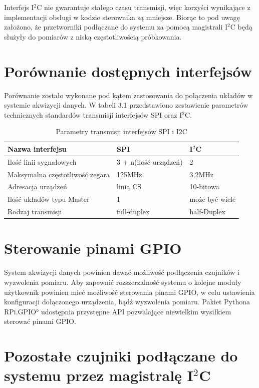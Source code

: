Interfejs I$^2$C nie gwarantuje stałego czasu transmisji, więc korzyści wynikające z implementacji obsługi w kodzie sterownika są mniejsze. Biorąc to pod uwagę założono, że przetworniki podłączane do systemu za pomocą magistrali I$^2$C będą służyły do pomiarów z niską częstotliwością próbkowania.

\section{Porównanie dostępnych interfejsów}

Porównanie zostało wykonane pod kątem zastosowania do połączenia układów w systemie akwizycji danych. W tabeli 3.1 przedstawiono zestawienie parametrów technicznych standardów transmisji interfejsów SPI oraz I$^2$C. 


\begin{table}[!ht]
\label{tab3.2}
\begin{tabular}{|l|l|l|}
  \hline 
  Nazwa interfejsu & SPI & I$^2$C\\
  \hline
  Ilość linii sygnałowych & 3 + n(ilość urządzeń)  & 2 \\
  \hline  
  Maksymalna częstotliwość zegara & 125MHz  & 3,2MHz \\
  \hline
  Adresacja urządzeń & linia CS & 10-bitowa  \\
  \hline
  Ilość układów typu Master & 1 & może być wiele\\
  \hline
  Rodzaj transmisji & full-duplex & half-Duplex\\
  \hline
  
\end{tabular}
\caption{Parametry transmisji interfejsów SPI i I2C} 
\end{table}

\section{Sterowanie pinami GPIO}

System akwizycji danych powinien dawać możliwość podłączenia czujników i wyzwolenia pomiaru. Aby zapewnić rozszerzalność systemu o kolejne moduły użytkownik powinien mieć możliwość sterowania pinami GPIO, w celu ustawienia konfiguracji dołączonego urządzenia, bądź wyzwolenia pomiaru.
Pakiet Pythona \ang{RPi.GPIO} udostępnia przystępne API pozwalające niewielkim wysiłkiem sterować pinami GPIO.\cite{rpigpio}

\section{Pozostałe czujniki podłączane do systemu przez magistralę I$^2$C}

